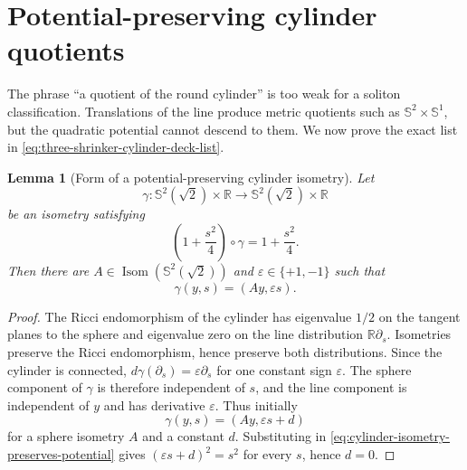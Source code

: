 \documentclass[10pt]{coll-l}
\newcommand{\Isom}{\operatorname{Isom}}
\newcommand{\R}{\mathbb{R}}
\newcommand{\Sph}{\mathbb{S}}
\newtheorem{lemma}[theorem]{Lemma}
\theoremstyle{definition}
\theoremstyle{remark}
\numberwithin{section}{chapter}
\numberwithin{equation}{chapter}
\begin{document}
\section{Potential-preserving cylinder quotients}
\label{sec:shrinker-cylinder-quotients}

The phrase ``a quotient of the round cylinder'' is too weak for a soliton
classification.  Translations of the line produce metric quotients such as
$\Sph^2\times\Sph^1$, but the quadratic potential cannot descend to them.
We now prove the exact list in
\eqref{eq:three-shrinker-cylinder-deck-list}.

\begin{lemma}[Form of a potential-preserving cylinder isometry]
\label{lem:potential-preserving-cylinder-isometry}
Let
\[
 \gamma:\Sph^2(\sqrt2)\times\R
       \longrightarrow\Sph^2(\sqrt2)\times\R
\]
be an isometry satisfying
\begin{equation}
          \left(1+\frac{s^2}{4}\right)\circ\gamma
              =1+\frac{s^2}{4}.                          \label{eq:cylinder-isometry-preserves-potential}
\end{equation}
Then there are $A\in\Isom(\Sph^2(\sqrt2))$ and
$\varepsilon\in\{+1,-1\}$ such that
\begin{equation}
                         \gamma(y,s)=(Ay,\varepsilon s). \label{eq:cylinder-isometry-normal-form}
\end{equation}
\end{lemma}

\begin{proof}
The Ricci endomorphism of the cylinder has eigenvalue $1/2$ on the tangent
planes to the sphere and eigenvalue zero on the line distribution
$\R\partial_s$.  Isometries preserve the Ricci endomorphism, hence preserve
both distributions.  Since the cylinder is connected,
$d\gamma(\partial_s)=\varepsilon\partial_s$ for one constant sign
$\varepsilon$.  The sphere component of $\gamma$ is therefore independent
of $s$, and the line component is independent of $y$ and has derivative
$\varepsilon$.  Thus initially
\[
                         \gamma(y,s)=(Ay,\varepsilon s+d)
\]
for a sphere isometry $A$ and a constant $d$.  Substituting in
\eqref{eq:cylinder-isometry-preserves-potential} gives
$(\varepsilon s+d)^2=s^2$ for every $s$, hence $d=0$.
\end{proof}
\end{document}
